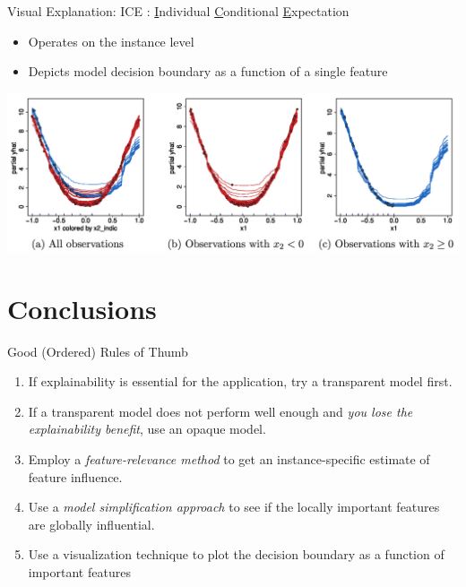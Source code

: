 \documentclass[11pt,dvipsnames,usenames,aspectratio=169]{beamer}  %
\begin{document}
\begin{frame}{Visual Explanation: ICE}
      \textbf{}: \underline{I}ndividual \underline{C}onditional \underline{E}xpectation~\citep{Goldstein:2015}

      \begin{itemize}
        \setlength{\itemsep}{10pt}
        \item Operates on the instance level
        \item Depicts model decision boundary as a function of a single feature
      \end{itemize}

      \vspace{8pt}
      \begin{center}
        \includegraphics[scale=0.2]{ice_plots.png}
      \end{center}
\end{frame}

\section{Conclusions}

\begin{frame}{Good (Ordered) Rules of Thumb}{}
  \begin{enumerate}
    \setlength{\itemsep}{16pt}
    \item If explainability is essential for the application, try a transparent model first.
    \item If a transparent model does not perform well enough and \textit{you lose the explainability benefit}, use an opaque model.
    \item Employ a \textit{feature-relevance method} to get an instance-specific estimate of feature influence.
    \item Use a \textit{model simplification approach} to see if the locally important features are globally influential.
    \item Use a visualization technique to plot the decision boundary as a function of important features
  \end{enumerate}
\end{frame}
\end{document}
